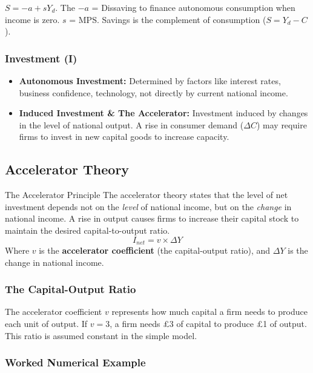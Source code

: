 \documentclass[11pt, a4paper, twoside]{book}
\begin{document}
$S = -a + sY_d$. The $-a$ = Dissaving to finance autonomous consumption when income is zero. $s$ = MPS. Savings is the complement of consumption ($S = Y_d - C$).

\subsubsection{Investment (I)}

\begin{itemize}
  \item \textbf{Autonomous Investment:} Determined by factors like interest rates, business confidence, technology, not directly by current national income.
  \item \textbf{Induced Investment \& The Accelerator:} Investment induced by changes in the level of national output. A rise in consumer demand ($\Delta C$) may require firms to invest in new capital goods to increase capacity.
\end{itemize}

\subsection{Accelerator Theory}

\begin{keyterm}{The Accelerator Principle}
The accelerator theory states that the level of net investment depends not on the \textit{level} of national income, but on the \textit{change} in national income. A rise in output causes firms to increase their capital stock to maintain the desired capital-to-output ratio.
$$I_{net} = v \times \Delta Y$$
Where $v$ is the \textbf{accelerator coefficient} (the capital-output ratio), and $\Delta Y$ is the change in national income.
\end{keyterm}

\subsubsection{The Capital-Output Ratio}

The accelerator coefficient $v$ represents how much capital a firm needs to produce each unit of output. If $v = 3$, a firm needs \pounds3 of capital to produce \pounds1 of output. This ratio is assumed constant in the simple model.

\subsubsection{Worked Numerical Example}
\end{document}
